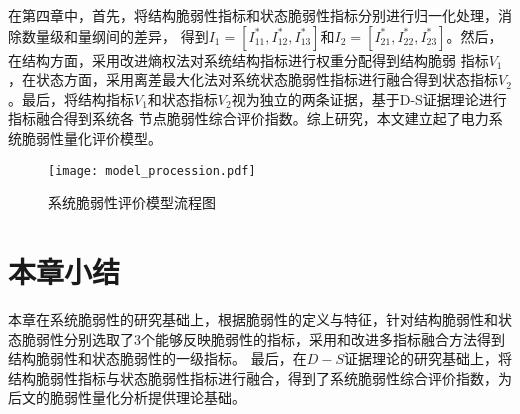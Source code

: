 在第四章中，首先，将结构脆弱性指标和状态脆弱性指标分别进行归一化处理，消除数量级和量纲间的差异，
得到$I_1 = \left[I^*_{11},I^*_{12},I^*_{13}\right]$和$I_2 = \left[I^*_{21},I^*_{22},I^*_{23}\right]$。然后，在结构方面，采用改进熵权法对系统结构指标进行权重分配得到结构脆弱
指标$V_1$，在状态方面，采用离差最大化法对系统状态脆弱性指标进行融合得到状态指标$V_2$。最后，将结构指标$V_1$和状态指标$V_2$视为独立的两条证据，基于D-S证据理论进行指标融合得到系统各
节点脆弱性综合评价指数。综上研究，本文建立起了电力系统脆弱性量化评价模型。
\begin{figure}[H] %
  \centering
  \texttt{[image: model\_procession.pdf]}
  \caption{系统脆弱性评价模型流程图}
  \label{fig:model_procession}
\end{figure}


\section{本章小结}
\label{sec:sum4}
本章在系统脆弱性的研究基础上，根据脆弱性的定义与特征，针对结构脆弱性和状态脆弱性分别选取了3个能够反映脆弱性的指标，采用和改进多指标融合方法得到结构脆弱性和状态脆弱性的一级指标。
最后，在$D-S$证据理论的研究基础上，将结构脆弱性指标与状态脆弱性指标进行融合，得到了系统脆弱性综合评价指数，为后文的脆弱性量化分析提供理论基础。



